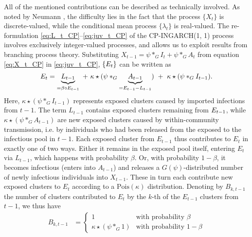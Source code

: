 \documentclass{article}
\begin{document}
All of the mentioned contributions can be described as technically involved. As noted by Neumann \cite{Neumann2011}, the difficulty lies in the fact that the process $\{X_t\}$ is discrete-valued, while the conditional mean process $\{\lambda_t\}$ is real-valued. The re-formulation \eqref{eq:L_t_CP}--\eqref{eq:juv_t_CP} of the CP-INGARCH(1, 1) process involves exclusively integer-valued processes, and allows us to exploit results from branching process theory. Substituting $X_{t - 1} = \psi *_G I_t + \psi *_G A_t$ from equation \eqref{eq:X_t_CP} in \eqref{eq:juv_t_CP}, $\{E_t\}$ can be written as
\begin{align}
E_t = \underbrace{L_{t - 1}}_{= \beta \circ E_{t - 1}} \ + \ \kappa \star (\psi *_G \underbrace{A_{t - 1}}_{ = E_{t - 1} - L_{t - 1}}) \ + \ \kappa \star (\psi *_G I_{t - 1}). \label{eq:recursion_S}
\end{align}
Here, $\kappa \star (\psi *_G I_{t - 1})$ represents exposed clusters caused by imported infections from $t - 1$. The term  $L_{t - 1}$ contains exposed clusters remaining from $ E_{t - 1}$, while $\kappa \star (\psi *_G A_{t - 1})$ are new exposed clusters caused by within-community transmission, i.e. by individuals who had been released from the exposed to the infectious pool in $t - 1$. Each exposed cluster from $E_{t - 1}$ thus contributes to $E_t$ in exactly one of two ways. Either it remains in the exposed pool itself, entering $E_t$ via $L_{t - 1}$, which happens with probability $\beta$. Or, with probability $1 - \beta$, it becomes infectious (enters into $A_{t - 1}$) and releases a $G(\psi)$-distributed number of newly infectious individuals into $X_{t - 1}$. These in turn each contribute new exposed clusters to $E_t$ according to a $\text{Pois}(\kappa)$ distribution. Denoting by $B_{k, t - 1}$ the number of clusters contributed to $E_t$ by the $k$-th of the $E_{t - 1}$ clusters from $t - 1$, we thus have
\begin{align}
B_{k, t - 1} & = \begin{cases}
1 & \text{with probability } \beta\\ %
\kappa \star (\psi *_G 1) & \text{with probability } 1 - \beta %
\label{eq:Z_t_i}
\end{cases}
\end{align}
\end{document}
